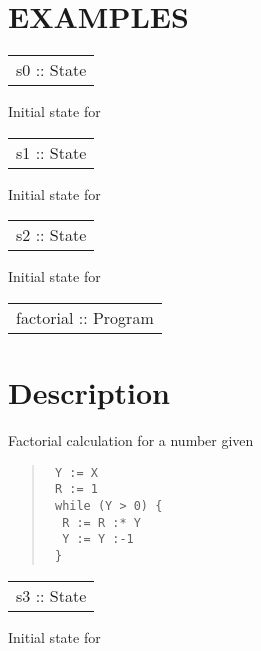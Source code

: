 \section{EXAMPLES}
\begin{haddockdesc}
\item[\begin{tabular}{@{}l}
s0 :: State
\end{tabular}]
{\haddockbegindoc
Initial state for \par}
\end{haddockdesc}
\begin{haddockdesc}
\item[\begin{tabular}{@{}l}
s1 :: State
\end{tabular}]
{\haddockbegindoc
Initial state for \par}
\end{haddockdesc}
\begin{haddockdesc}
\item[\begin{tabular}{@{}l}
s2 :: State
\end{tabular}]
{\haddockbegindoc
Initial state for \par}
\end{haddockdesc}
\begin{haddockdesc}
\item[\begin{tabular}{@{}l}
factorial :: Program
\end{tabular}]
{\haddockbegindoc
\section*{Description}
Factorial calculation for a number given\par
\begin{quote}
{\haddockverb\begin{verbatim}
 Y := X
 R := 1
 while (Y > 0) {
  R := R :* Y
  Y := Y :-1
 }
\end{verbatim}}
\end{quote}}
\end{haddockdesc}
\begin{haddockdesc}
\item[\begin{tabular}{@{}l}
s3 :: State
\end{tabular}]
{\haddockbegindoc
Initial state for \par}
\end{haddockdesc}

